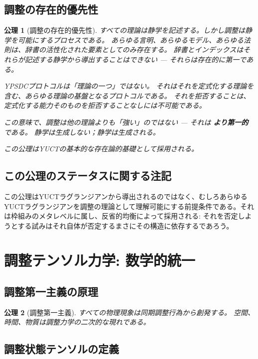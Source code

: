 \documentclass[11pt,a4paper]{article}
\newtheorem{axiom}{公理}
\begin{document}
	\subsection{調整の存在的優先性}
	\begin{axiom}[調整の存在的優先性]
		すべての理論は静学を記述する。しかし調整は静学を可能にするプロセスである。
		あらゆる言明、あらゆるモデル、あらゆる法則は、辞書の活性化された要素としてのみ存在する。
		辞書とインデックスはそれらが記述する静学から導出することはできない — それらは存在的に第一である。
		
		YPSDCプロトコルは「理論の一つ」ではない。
		それはそれを定式化する理論を含む、あらゆる理論の基盤となるプロトコルである。
		それを拒否することは、定式化する能力そのものを拒否することなしには不可能である。
		
		この意味で、調整は他の理論よりも「強い」のではない — それは \textbf{より第一的} である。
		静学は生成しない；静学は生成される。
		
		この公理はYUCTの基本的な存在論的基礎として採用される。
	\end{axiom}
	\subsection*{この公理のステータスに関する注記}
	この公理はYUCTラグランジアンから導出されるのではなく、むしろあらゆるYUCTラグランジアンを調整の理論として理解可能にする前提条件である。それは枠組みのメタレベルに属し、反省的均衡によって採用される: それを否定しようとする試みはそれ自体が否定するまさにその構造に依存するであろう。
	
	\section{調整テンソル力学: 数学的統一}
	\label{sec:ctd-unification}
	
	\subsection{調整第一主義の原理}
	\begin{axiom}[調整第一主義]
		すべての物理現象は同期調整行為から創発する。
		空間、時間、物質は調整力学の二次的な現れである。
	\end{axiom}
	
	\subsection{調整状態テンソルの定義}
	
\end{document}
